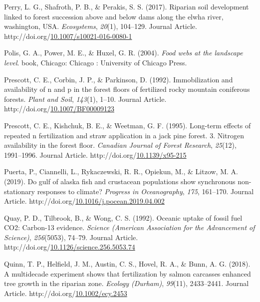 \documentclass [11pt, proquest] {uwthesis}[2015/03/03]
\newlength{\cslhangindent}
\newenvironment{CSLReferences}%
{\setlength{\parindent}{0pt}%
\everypar{\setlength{\hangindent}{\cslhangindent}}\ignorespaces}%
{\par}
\begin{document}
\begin{CSLReferences}{1}{0}
\leavevmode\hypertarget{ref-Perry2017}{}%
Perry, L. G., Shafroth, P. B., \& Perakis, S. S. (2017). Riparian soil development linked to forest succession above and below dams along the elwha river, washington, USA. \emph{Ecosystems}, \emph{20}(1), 104--129. Journal Article. http://doi.org/\href{https://doi.org/10.1007/s10021-016-0080-1}{10.1007/s10021-016-0080-1}

\leavevmode\hypertarget{ref-Polis2004}{}%
Polis, G. A., Power, M. E., \& Huxel, G. R. (2004). \emph{Food webs at the landscape level}. book, Chicago: Chicago : University of Chicago Press.

\leavevmode\hypertarget{ref-Prescott1992}{}%
Prescott, C. E., Corbin, J. P., \& Parkinson, D. (1992). Immobilization and availability of n and p in the forest floors of fertilized rocky mountain coniferous forests. \emph{Plant and Soil}, \emph{143}(1), 1--10. Journal Article. http://doi.org/\href{https://doi.org/10.1007/BF00009123}{10.1007/BF00009123}

\leavevmode\hypertarget{ref-Prescott1995}{}%
Prescott, C. E., Kishchuk, B. E., \& Weetman, G. F. (1995). Long-term effects of repeated n fertilization and straw application in a jack pine forest. 3. Nitrogen availability in the forest floor. \emph{Canadian Journal of Forest Research}, \emph{25}(12), 1991--1996. Journal Article. http://doi.org/\href{https://doi.org/10.1139/x95-215}{10.1139/x95-215}

\leavevmode\hypertarget{ref-Puerta2019}{}%
Puerta, P., Ciannelli, L., Rykaczewski, R. R., Opiekun, M., \& Litzow, M. A. (2019). Do gulf of alaska fish and crustacean populations show synchronous non-stationary responses to climate? \emph{Progress in Oceanography}, \emph{175}, 161--170. Journal Article. http://doi.org/\href{https://doi.org/10.1016/j.pocean.2019.04.002}{10.1016/j.pocean.2019.04.002}

\leavevmode\hypertarget{ref-Quay1992}{}%
Quay, P. D., Tilbrook, B., \& Wong, C. S. (1992). Oceanic uptake of fossil fuel CO2: Carbon-13 evidence. \emph{Science (American Association for the Advancement of Science)}, \emph{256}(5053), 74--79. Journal Article. http://doi.org/\href{https://doi.org/10.1126/science.256.5053.74}{10.1126/science.256.5053.74}

\leavevmode\hypertarget{ref-Quinn2018}{}%
Quinn, T. P., Helfield, J. M., Austin, C. S., Hovel, R. A., \& Bunn, A. G. (2018). A multidecade experiment shows that fertilization by salmon carcasses enhanced tree growth in the riparian zone. \emph{Ecology (Durham)}, \emph{99}(11), 2433--2441. Journal Article. http://doi.org/\href{https://doi.org/10.1002/ecy.2453}{10.1002/ecy.2453}


\end{CSLReferences}
\end{document}
